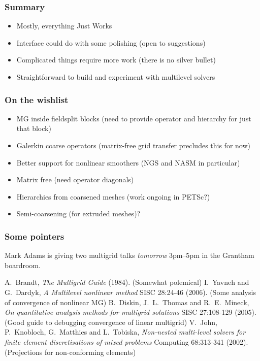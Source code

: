 \documentclass[presentation]{beamer}
\begin{document}
\begin{frame}
  \frametitle{Summary}
  \begin{itemize}
  \item Mostly, everything Just Works
  \item Interface could do with some polishing (open to suggestions)
  \item Complicated things require more work (there is no silver
    bullet)
  \item Straightforward to build and experiment with multilevel
    solvers
  \end{itemize}
\end{frame}

\begin{frame}
  \frametitle{On the wishlist}
  \begin{itemize}
  \item MG inside fieldsplit blocks (need to provide operator and
    hierarchy for just that block)
  \item Galerkin coarse operators (matrix-free grid transfer precludes
    this for now)
  \item Better support for nonlinear smoothers (NGS and NASM in
    particular)
  \item Matrix free (need operator diagonals)
  \item Hierarchies from coarsened meshes (work ongoing in PETSc?)
  \item Semi-coarsening (for extruded meshes)?
  \end{itemize}
\end{frame}

\begin{frame}
  \frametitle{Some pointers}
  Mark Adams is giving two multigrid talks \emph{tomorrow} 3pm--5pm in
  the Grantham boardroom.

  \begin{thebibliography}{99}
   A.~Brandt, \emph{The Multigrid
      Guide} (1984).  (Somewhat polemical)
   I.~Yavneh and G.~Dardyk, \emph{A
      Multilevel nonlinear method} SISC 28:24-46 (2006).  (Some
    analysis of convergence of nonlinear MG)
   B.~Diskin, J.~L.~Thomas and
    R.~E.~Mineck, \emph{On quantitative analysis methods for multigrid
      solutions}  SISC 27:108-129 (2005).  (Good guide to debugging
    convergence of linear multigrid)
   V.~John, P.~Knobloch, G.~Matthies
    and L.~Tobiska, \emph{Non-nested multi-level solvers for finite
      element discretisations of mixed problems} Computing 68:313-341
    (2002).  (Projections for non-conforming elements)
  \end{thebibliography}
\end{frame}
\end{document}
